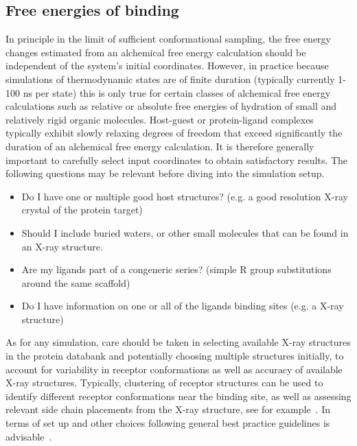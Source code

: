 \documentclass[9pt,bestpractices]{livecoms}
\begin{document}
\subsection*{Free energies of binding}
In principle in the limit of sufficient conformational sampling, the free energy changes estimated from an alchemical free energy calculation should be independent of the system's initial coordinates. However, in practice because simulations of thermodynamic states are of finite duration (typically currently 1-100 ns per state) this is only true for certain classes of alchemical free energy calculations such as relative or absolute free energies of hydration of small and relatively rigid organic molecules. Host-guest or protein-ligand complexes typically exhibit slowly relaxing degrees of freedom that exceed significantly the duration of an alchemical free energy calculation. It is therefore generally important to carefully select input coordinates to obtain satisfactory results. 
The following questions may be relevant before diving into the simulation setup. 
\begin{itemize}
    \item Do I have one or multiple good host structures? (e.g. a good resolution X-ray crystal of the protein target)
    \item Should I include buried waters, or other small molecules that can be found in an X-ray structure.
    \item Are my ligands part of a congeneric series? (simple R group substitutions around the same scaffold)
    \item Do I have information on one or all of the ligands binding sites (e.g. a X-ray structure)
\end{itemize}

As for any simulation, care should be taken in selecting available X-ray structures in the protein databank and potentially choosing multiple structures initially, to account for variability in receptor conformations as well as accuracy of available X-ray structures. Typically, clustering of receptor structures can be used to identify different receptor conformations near the binding site, as well as assessing relevant side chain placements from the X-ray structure, see for example~\cite{mey2016blinded}. In terms of set up and other choices following general best practice guidelines is advisable~\cite{braun2018best}.
\end{document}
